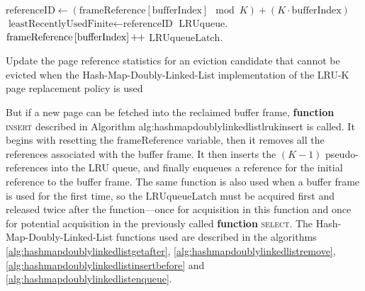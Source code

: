 \begin{@empty}
    \newcommand{\plusplus}{\mathord{\mathord{+}\hspace*{-1pt}\mathord{+}}}
    
    \begin{algorithm}[h]
        \scriptsize
        \begin{algorithmic}[1]
                \State $\text{referenceID} \gets \left(\text{frameReference}\left[\text{bufferIndex}\right] \mod K\right) + \left(K \cdot \text{bufferIndex}\right)$
                    \State $\text{leastRecentlyUsedFinite} \gets \text{referenceID}$
                \EndIf
                \State $\text{LRUqueue}$.
                \State $\text{frameReference}\left[\text{bufferIndex}\right]\plusplus$
                \State $\text{LRUqueueLatch}.$
            \EndFunction
        \end{algorithmic}
        \vspace{1em}
        \caption[{\footnotesize \textbf{function} \textsc{notEvictabl}} of Hash-Map-Doubly-Linked-List LRU-K]{Update the page reference statistics for an eviction candidate that cannot be evicted when the Hash-Map-Doubly-Linked-List implementation of the LRU-K page replacement policy is used}
        \label{alg:hashmapdoublylinkedlistlruknotEvictabl}
    \end{algorithm}
\end{@empty}

    But if a new page can be fetched into the reclaimed buffer frame, {\footnotesize \textbf{function} \textsc{insert}} described in Algorithm {alg:hashmapdoublylinkedlistlrukinsert} is called. It begins with resetting the $\text{frameReference}$ variable, then it removes all the references associated with the buffer frame. It then inserts the $\left(K - 1\right)$ pseudo-references into the LRU queue, and finally enqueues a reference for the initial reference to the buffer frame. The same function is also used when a buffer frame is used for the first time, so the $\text{LRUqueueLatch}$ must be acquired first and released twice after the function---once for acquisition in this function and once for potential acquisition in the previously called {\footnotesize \textbf{function} \textsc{select}}. The Hash-Map-Doubly-Linked-List functions used are described in the algorithms \ref{alg:hashmapdoublylinkedlistgetafter}, \ref{alg:hashmapdoublylinkedlistremove}, \ref{alg:hashmapdoublylinkedlistinsertbefore} and \ref{alg:hashmapdoublylinkedlistenqueue}.

